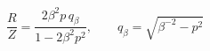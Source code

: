 $$
\boxed{\;\frac{R}{Z} = \frac{2\beta^{2} p\, q_\beta}{1 - 2\beta^{2} p^{2}},\qquad q_\beta = \sqrt{\beta^{-2} - p^2}\;}
\label{eq:halfspace}
$$
